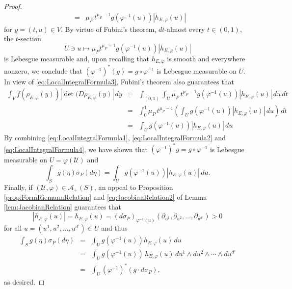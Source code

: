 \documentclass[11pt]{article}
\renewcommand\det{\operatorname{det}}
\begin{document}
\begin{proof}
\begin{eqnarray}
    &=& \mu_P\,t^{\mu_P-1}g(\varphi^{-1}(u))|h_{E,\varphi}(u)|
\end{eqnarray}
for $y=(t,u)\in V$. By virtue of Fubini's theorem, $dt$-almost every $t\in (0,1)$, the $t$-section 
\begin{equation*}
    U\ni u\mapsto \mu_P t^{\mu_P-1}g(\varphi^{-1}(u))|h_{E,\varphi}(u)|
\end{equation*}
is Lebesgue measurable and,  upon recalling that $h_{E,\varphi}$ is smooth and everywhere nonzero, we conclude that $(\varphi^{-1})^*(g)=g\circ\varphi^{-1}$ is Lebesgue measurable on $U$. In view of \eqref{eq:LocalIntegralFormula3}, Fubini's theorem also guarantees that
\begin{eqnarray}\label{eq:LocalIntegralFormula4}\nonumber
    \int_V f(\rho_{E,\varphi}(y))|\det(D\rho_{E,\varphi}(y)|\,dy
    &=&\int_{(0,1)}\int_U \mu_P\, t^{\mu_P-1}g(\varphi^{-1}(u))|h_{E,\varphi}(u)|\,du\,dt\\\nonumber
    &=&\int_0^1\mu_P\, t^{\mu_P-1}\left(\int_U g(\varphi^{-1}(u))|h_{E,\varphi}(u)|\,du\right)\,dt\\
    &=&\int_U g(\varphi^{-1}(u))|h_{E,\varphi}(u)|\,du
\end{eqnarray}
By combining \eqref{eq:LocalIntegralFormula1}, \eqref{eq:LocalIntegralFormula2} and \eqref{eq:LocalIntegralFormula4}, we have shown that $(\varphi^{-1})^*g=g\circ\varphi^{-1}$ is Lebesgue measurable on $U=\varphi(\mathcal{U})$ and
\begin{equation*}
    \int_S g(\eta)\sigma_P(d\eta)=\int_U g(\varphi^{-1}(u))|h_{E,\varphi}(u)|\,du.
\end{equation*}
Finally, if $(\mathcal{U},\varphi)\in\mathcal{A}_+(S)$, an appeal to Proposition \ref{prop:FormRiemannRelation} and \eqref{eq:JacobianRelation2} of Lemma \ref{lem:JacobianRelation} guarantees that
\begin{equation*}
    |h_{E,\varphi}(u)|=h_{E,\varphi}(u)=(d\sigma_P)_{\varphi^{-1}(u)}(\partial_{u^1},\partial_{u^2},\dots,\partial_{u^{d'}})>0
\end{equation*}
for all $u=(u^1,u^2,\dots,u^{d'})\in U$ and thus
\begin{eqnarray*}
        \int_S g(\eta)\sigma_P(d\eta)&=&\int_U g(\varphi^{-1}(u))h_{E,\varphi}(u)\,du\\
        &=&\int_U g(\varphi^{-1}(u))\,h_{E,\varphi}(u)\,du^1\wedge du^2\wedge\cdots \wedge du^{d'}\\
        &=&\int_U (\varphi^{-1})^*(g\cdot d\sigma_P),
\end{eqnarray*}
as desired. 
\end{proof}
\end{document}
